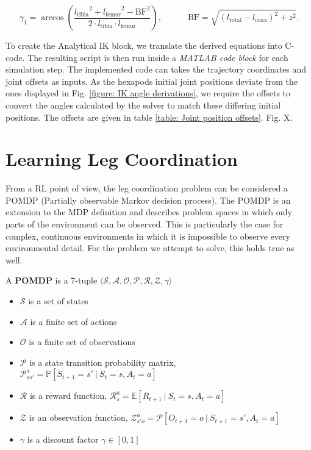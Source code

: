 \[
	\gamma_1 = \arccos(\frac{{l_\text{tibia}}^2 + {l_\text{femur}}^2 - {\text{BF}}^2}  {2 \cdot {l_\text{tibia}} \cdot {l_\text{femur}}}) ,\quad \quad \quad \text{BF} = \sqrt{(l_\text{total} - l_\text{coxa})^2 + z^2}.
\]

To create the Analytical IK block, we translate the derived equations into C-code.
The resulting script is then run inside a \textit{MATLAB code block} for each simulation step.
The implemented code can takes the trajectory coordinates and joint offsets as inputs.
As the hexapods initial joint positions deviate from the ones displayed in Fig. \ref{figure: IK angle derivations}, we require the offsets to convert the angles calculated by the solver to match these differing initial positions.
The offsets are given in table \ref{table: Joint position offsets}.
Fig. X. 


\section{Learning Leg Coordination} \label{sec: RL setup}
From a RL point of view, the leg coordination problem can be considered a POMDP (Partially observable Markov decision process).
The POMDP is an extension to the MDP definition and describes problem spaces in which only parts of the environment can be observed.
This is particularly the case for complex, continuous environments in which it is impossible to observe every environmental detail.
For the problem we attempt to solve, this holds true as well.

\begin{definition}
	A \textbf{POMDP} is a 7-tuple $\langle \mathcal{S,A,O,P,R,Z,\gamma} \rangle$
	\begin{itemize}
		\item $\mathcal{S}$ is a set of states
		\item $\mathcal{A}$ is a finite set of actions
		\item $\mathcal{O}$ is a finite set of observations
		\item $\mathcal{P}$ is a state transition probability matrix, $\mathcal{P}_{ss'}^a = \mathbb{P}[S_{t+1} = s' \ | \ S_t = s, A_t = a	] $
		\item $\mathcal{R}$ is a reward function, $\mathcal{R}_s^a = \mathbb{E}[R_{t+1} \ | \ S_t = s, A_t = a]$
		\item $\mathcal{Z}$ is an observation function, $\mathcal{Z}_{s'o}^a = \mathcal{P}[O_{t+1} = o \ | \ S_{t+1} = s', A_t = a]$
		\item $\mathcal{\gamma}$ is a discount factor $\mathcal{\gamma} \in [0,1]$
	\end{itemize}
\end{definition}

